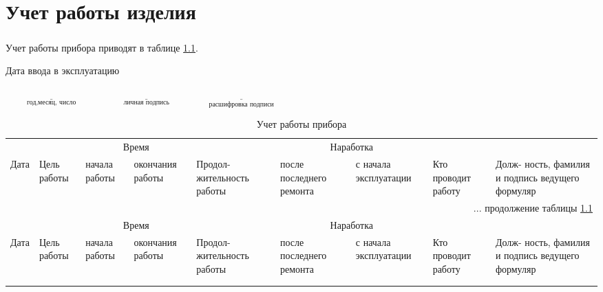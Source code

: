 \chapter{Учет работы изделия}

\paragraph{} Учет работы прибора приводят в таблице \ref{tab:time_work}.
	
	Дата ввода в эксплуатацию 

	\hspace{2cm}
	 $\underset{\text{год,месяц, число}}{\underline{\hspace{4cm}}}$ \hspace{0.5cm}
	$\underset{\text{личная подпись}}{\underline{\hspace{4cm}}}$
	\hspace{0.5cm}
	$\underset{\text{расшифровка подписи}}{\underline{\hspace{4cm}}}$
	
	\begin{small}
	\begin{longtable}{|p{0.9cm}|p{1.1cm}|p{1.5cm}|p{2.1cm}|p{1.8cm}|p{1.3cm}|p{1.3cm}|p{1.5cm}|p{2.2cm}|}
		\caption{\label{tab:time_work} Учет работы прибора}\\ 
		
		\hline
				&& \multicolumn{2}{c|}{Время} && \multicolumn{2}{c|}{Наработка}&&\\
		\cline{3-4}	\cline{6-7}
		Дата &Цель работы &начала работы &окончания работы& Продол- жительность работы& после последнего ремонта& с начала эксплуатации& Кто проводит работу & Долж- ность, фамилия и подпись ведущего формуляр\\
		\endfirsthead

		\multicolumn{9}{r}{... продолжение таблицы \ref{tab:time_work}}\\ %
		\hline
				&& \multicolumn{2}{c|}{Время} && \multicolumn{2}{c|}{Наработка}&&\\
		\cline{3-4}	\cline{6-7}
		Дата &Цель работы &начала работы &окончания работы& Продол- жительность работы& после последнего ремонта& с начала эксплуатации& Кто проводит работу & Долж- ность, фамилия и подпись ведущего формуляр\\
		\endhead
		
				
				\hline
 				\rule{0cm}{15cm}& & & & & & & & \\ \hline
 				\rule{0cm}{20cm}& & & & & & & & \\
				\hline
		
	\end{longtable}
	\end{small}




